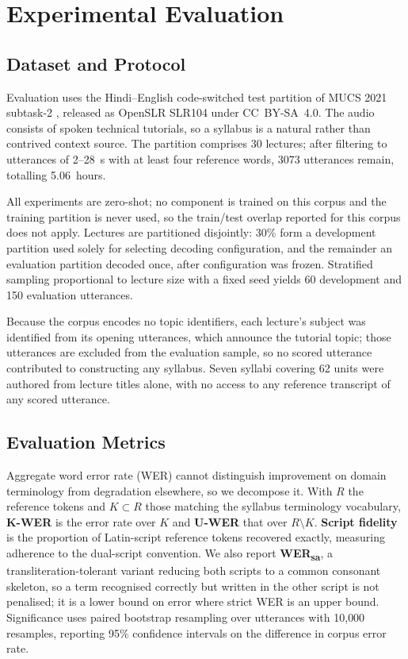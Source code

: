 \documentclass[conference]{IEEEtran}
\begin{document}
\section{Experimental Evaluation}

\subsection{Dataset and Protocol}

Evaluation uses the Hindi--English code-switched test partition of MUCS 2021
subtask-2 \cite{diwan2021mucs}, released as OpenSLR SLR104 \cite{openslr104}
under CC~BY-SA~4.0. The audio consists of spoken technical tutorials, so a
syllabus is a natural rather than contrived context source. The partition
comprises 30 lectures; after filtering to utterances of 2--28~s with at least
four reference words, 3073 utterances remain, totalling 5.06~hours.

All experiments are zero-shot; no component is trained on this corpus and the
training partition is never used, so the train/test overlap reported for this
corpus does not apply. Lectures are partitioned disjointly: 30\% form a
development partition used solely for selecting decoding configuration, and the
remainder an evaluation partition decoded once, after configuration was frozen.
Stratified sampling proportional to lecture size with a fixed seed yields 60
development and 150 evaluation utterances.

Because the corpus encodes no topic identifiers, each lecture's subject was
identified from its opening utterances, which announce the tutorial topic; those
utterances are excluded from the evaluation sample, so no scored utterance
contributed to constructing any syllabus. Seven syllabi covering 62 units were
authored from lecture titles alone, with no access to any reference transcript of
any scored utterance.

\subsection{Evaluation Metrics}

Aggregate word error rate (WER) cannot distinguish improvement on domain
terminology from degradation elsewhere, so we decompose it. With $R$ the
reference tokens and $K \subset R$ those matching the syllabus terminology
vocabulary, \textbf{K-WER} is the error rate over $K$ and \textbf{U-WER} that
over $R \setminus K$. \textbf{Script fidelity} is the proportion of Latin-script
reference tokens recovered exactly, measuring adherence to the dual-script
convention. We also report \textbf{WER\textsubscript{sa}}, a
transliteration-tolerant variant reducing both scripts to a common consonant
skeleton, so a term recognised correctly but written in the other script is not
penalised; it is a lower bound on error where strict WER is an upper bound.
Significance uses paired bootstrap resampling over utterances
\cite{koehn2004significance} with 10{,}000 resamples, reporting 95\% confidence
intervals on the difference in corpus error rate.
\end{document}
